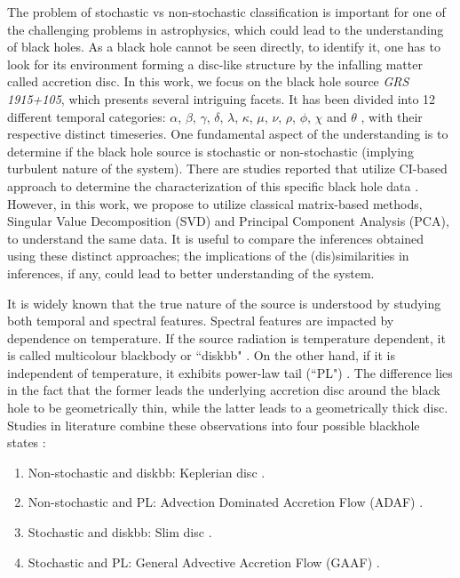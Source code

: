 \documentclass[journal]{IEEEtran}
\begin{document}
	The problem of stochastic vs non-stochastic classification is important for one of the challenging problems in astrophysics, which could lead to the understanding of black holes. As a black hole cannot be seen directly, to identify it, one has to look for its environment forming a disc-like structure by the infalling matter called accretion disc. In this work, we focus on the black hole source \textit{GRS 1915+105}, which presents several intriguing facets. It has been divided into 12 different temporal categories: $\alpha$, $\beta$, $\gamma$, $\delta$, $\lambda$, $\kappa$, $\mu$, $\nu$, $\rho$, $\phi$, $\chi$ and $\theta$ \cite{Belloni2000}, with their respective distinct timeseries. One fundamental aspect of the understanding is to determine if the black hole source is stochastic or non-stochastic (implying turbulent nature of the system). There are studies reported that utilize CI-based approach to determine the characterization of this specific black hole data \cite{Mukhopadhyay2004, misra2006}. However, in this work, we propose to utilize classical matrix-based methods, Singular Value Decomposition (SVD) and Principal Component Analysis (PCA), to understand the same data. It is useful to compare the inferences obtained using these distinct approaches; the implications of the (dis)similarities in inferences, if any, could lead to better understanding of the system.
	
	It is widely known that the true nature of the source is understood by studying both temporal and spectral features. Spectral features are impacted by dependence on temperature. If the source radiation is temperature dependent, it is called multicolour blackbody or ``diskbb" \cite{Shakura1973}. On the other hand, if it is independent of temperature, it exhibits power-law tail (``PL") \cite{chakrabarti1995,narayan1994}. The difference  lies in the fact that the former leads the underlying accretion disc around the black hole to be geometrically thin, while the latter leads to a geometrically thick disc. Studies in literature combine these observations into four possible blackhole states \cite{Adegoke2018}:
	\begin{enumerate}
		\item Non-stochastic and diskbb: Keplerian disc \cite{Shakura1973}.
		\item Non-stochastic and PL: Advection Dominated Accretion Flow (ADAF)  \cite{narayan1994}.
		\item Stochastic and diskbb: Slim disc \cite{Abramowicz1988}.
		\item Stochastic and PL: General Advective Accretion Flow (GAAF) \cite{chakrabarti1995, rajesh2010}.
	\end{enumerate}
	
\end{document}

